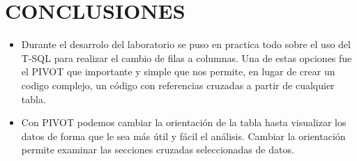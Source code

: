 \section{CONCLUSIONES}
\begin{itemize}
	\item Durante el desarrolo del laboratorio se puso en practica todo sobre el uso del T-SQL para realizar el cambio de filas a columnas. Una de estas opciones fue el PIVOT que importante y simple que nos permite, en lugar de crear un codigo complejo, un código con referencias cruzadas a partir de cualquier tabla.
	\item Con PIVOT podemos cambiar la orientación de la tabla hasta visualizar los datos de forma que le sea más útil y fácil el análisis. Cambiar la orientación permite examinar las secciones cruzadas seleccionadas de datos.
\end{itemize}

